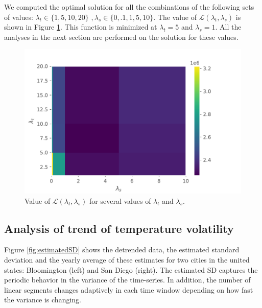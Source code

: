 \documentclass[review]{elsarticle}
\begin{document}
We computed the optimal solution for all the combinations of the following sets of values: $\lambda_t \in \{1,5,10,20\} \, \, , \lambda_s \in \{0,.1,1,5,10\}$. The value of $\mathscr{L}(\lambda_t,\lambda_s)$ is shown in Figure \ref{fig:modelSelect}. This function is minimized at $\lambda_t=5$ and $\lambda_s=1$. All the analyses in the next section are performed on the solution for these values.

\begin{figure}[ht]
	\vskip 0.2in
	\begin{center}
		\centerline{\includegraphics[width=1\columnwidth]{Figures/modelSelect}}
		\caption{Value of $\mathscr{L}(\lambda_t,\lambda_s)$ for several values of $\lambda_t$ and $\lambda_s$. }
		\label{fig:modelSelect}
	\end{center}
	\vskip -0.2in
\end{figure}

\subsection{Analysis of trend of temperature volatility}
Figure \ref{fig:estimatedSD} shows the detrended data, the estimated standard deviation and the yearly average of these estimates for two cities in the united states: Bloomington (left) and San Diego (right). The estimated SD captures the periodic behavior in the variance of the time-series. In addition, the number of linear segments changes adaptively in each time window depending on how fast the variance is changing. 
\end{document}
